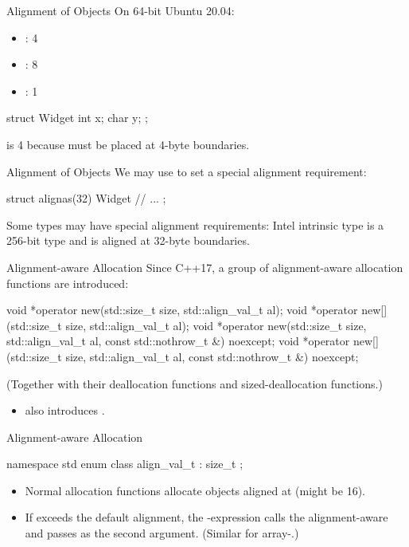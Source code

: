 \documentclass{beamer}
\begin{document}
\begin{frame}[fragile]{Alignment of Objects}
  On 64-bit Ubuntu 20.04:
  \begin{itemize}
    \item {}: 4
    \item {}: 8
    \item {}: 1
  \end{itemize}
  \pause
  \begin{cpp}
struct Widget {
  int x;
  char y;
};
  \end{cpp}
   is 4 because  must be placed at 4-byte boundaries.
\end{frame}

\begin{frame}[fragile]{Alignment of Objects}
  We may use  to set a special alignment requirement:
  \begin{cpp}
struct alignas(32) Widget {
  // ...
};
  \end{cpp}
  \pause
  Some types may have special alignment requirements: Intel intrinsic type  is a 256-bit type and is aligned at 32-byte boundaries.
\end{frame}

\begin{frame}[fragile]{Alignment-aware Allocation}
  Since C++17, a group of alignment-aware allocation functions are introduced:
  \begin{cpp}[\scriptsize]
void *operator new(std::size_t size, std::align_val_t al);
void *operator new[](std::size_t size, std::align_val_t al);
void *operator new(std::size_t size,
      std::align_val_t al, const std::nothrow_t &) noexcept;
void *operator new[](std::size_t size,
      std::align_val_t al, const std::nothrow_t &) noexcept;
  \end{cpp}
  (Together with their deallocation functions and sized-deallocation functions.)
  \begin{itemize}
    \item {} also introduces .
  \end{itemize}
\end{frame}

\begin{frame}[fragile]{Alignment-aware Allocation}
  \begin{cpp}
namespace std {
  enum class align_val_t : size_t {};
}
  \end{cpp}
  \begin{itemize}
    \item Normal allocation functions allocate objects aligned at  (might be 16).
    \item If  exceeds the default  alignment, the -expression calls the alignment-aware  and passes  as the second argument. (Similar for array-.)
  \end{itemize}
\end{frame}
\end{document}
